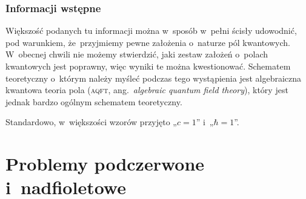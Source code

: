 \documentclass[10pt,t]{beamer}
\begin{document}
\begin{frame}
  \frametitle{Informacji wstępne}


  Większość podanych tu informacji można w~sposób w~pełni ścisły udowodnić,
  \alert{pod warunkiem}, że~przyjmiemy pewne założenia o~naturze pól
  kwantowych. W~obecnej chwili nie możemy stwierdzić, jaki zestaw założeń
  o~polach kwantowych jest poprawny, więc wyniki te można kwestionować.
  Schematem teoretyczny o~którym należy myśleć podczas tego wystąpienia
  jest algebraiczna kwantowa teoria pola (\textsc{aqft},
  ang.~\textit{algebraic quantum field theory}), który jest jednak bardzo
  ogólnym schematem teoretyczny.


  Standardowo, w~większości wzorów przyjęto „$c = 1$”
  i~„\HorSpaceFour$\hbar = 1$”.

\end{frame}










\section{Problemy podczerwone i~nadfioletowe}
\end{document}
